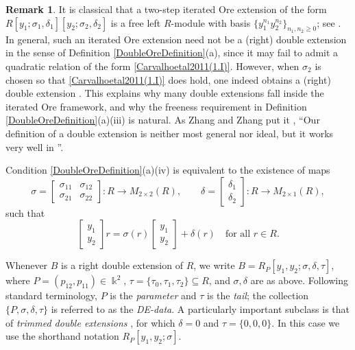 \documentclass{amsart}
\theoremstyle{definition}
\newtheorem{remark}[theorem]{Remark}
\theoremstyle{remark}
\numberwithin{equation}{section}
\begin{document}
\begin{remark}
It is classical that a two-step iterated Ore extension of the form 
$R[y_1;\sigma_1,\delta_1][y_2;\sigma_2,\delta_2]$
is a free left $R$-module with basis $\{y_1^{n_1}y_2^{n_2}\}_{n_1,n_2\ge 0}$; see \cite[Lemma 1.5]{ZhangZhang2008}.
In general, such an iterated Ore extension need not be a (right) double extension in the sense of Definition \ref{DoubleOreDefinition}(a), since it may fail to admit a quadratic relation of the form \eqref{Carvalhoetal2011(1.I)}.
However, when $\sigma_2$ is chosen so that \eqref{Carvalhoetal2011(1.I)} does hold, one indeed obtains a (right) double extension \cite[p. 2671]{ZhangZhang2008}.
This explains why many double extensions fall inside the iterated Ore framework, and why the freeness requirement in Definition \ref{DoubleOreDefinition}(a)(iii) is natural.
As Zhang and Zhang put it \cite[p. 2671]{ZhangZhang2008}, \textquotedblleft Our definition of a double extension is neither most general nor ideal, but it works very well in \cite{ZhangZhang2009}\textquotedblright.
\end{remark}

Condition \ref{DoubleOreDefinition}(a)(iv) is equivalent to the existence of maps
\[
\sigma=\begin{bmatrix}\sigma_{11}&\sigma_{12}\\ \sigma_{21}&\sigma_{22}\end{bmatrix}:R\to M_{2\times 2}(R),
\qquad
\delta=\begin{bmatrix}\delta_1\\ \delta_2\end{bmatrix}:R\to M_{2\times 1}(R),
\]
such that
\begin{equation}\label{Carvalhoetal2011(1.II)}
\begin{bmatrix}y_1\\ y_2\end{bmatrix}r
=\sigma(r)\begin{bmatrix}y_1\\ y_2\end{bmatrix}+\delta(r)
\quad\text{for all }r\in R.
\end{equation}

Whenever $B$ is a right double extension of $R$, we write
$B=R_P[y_1,y_2;\sigma,\delta,\tau]$,
where $P=(p_{12},p_{11})\in\Bbbk^2$, $\tau=\{\tau_0,\tau_1,\tau_2\}\subseteq R$, and $\sigma,\delta$ are as above.
Following standard terminology, $P$ is the \emph{parameter} and $\tau$ is the \emph{tail}; the collection $\{P,\sigma,\delta,\tau\}$ is referred to as the \emph{DE-data}.
A particularly important subclass is that of \emph{trimmed double extensions} \cite[Convention 1.6(c)]{ZhangZhang2008}, for which $\delta=0$ and $\tau=\{0,0,0\}$.
In this case we use the shorthand notation $R_P[y_1,y_2;\sigma]$.
\end{document}
